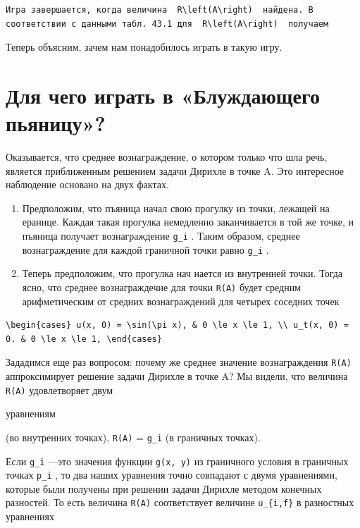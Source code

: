 \documentclass[
  ukrainian,
]{article}
\begin{document}
\begin{verbatim}
Игра завершается, когда величина  R\left(A\right)  найдена. В соответствии с данными табл. 43.1 для  R\left(A\right)  получаем
\end{verbatim}

Теперь объясним, зачем нам понадобилось играть в такую игру.

\section{Для чего играть в «Блуждающего
пьяницу»?}\label{ux434ux43bux44f-ux447ux435ux433ux43e-ux438ux433ux440ux430ux442ux44c-ux432-ux431ux43bux443ux436ux434ux430ux44eux449ux435ux433ux43e-ux43fux44cux44fux43dux438ux446ux443}

Оказывается, что среднее вознаграждение, о котором только что шла речь,
является приближенным решением задачи Дирихле в точке A. Это интересное
наблюдение основано на двух фактах.

\begin{enumerate}
\def\labelenumi{\arabic{enumi}.}
\item
  Предположим, что пъяница начал свою прогулку из точки, лежащей на
  еранице. Каждая такая прогулка немедленно заканчивается в той же
  точке, и пъяница получает вознаграждение \texttt{g\_i} . Таким
  образом, среднее вознаграждение для каждой граничной точки равно
  \texttt{g\_i} .
\item
  Теперь предположим, что прогулка нач нается из внутренней точки. Тогда
  ясно, что среднее вознаграждечие для точки \texttt{R(A)} будет средним
  арифметическим от средних вознаграждений для четырех соседних точек
\end{enumerate}

\begin{verbatim}
\begin{cases} u(x, 0) = \sin(\pi x), & 0 \le x \le 1, \\ u_t(x, 0) = 0. & 0 \le x \le 1, \end{cases}
\end{verbatim}

Зададимся еще раз вопросом: почему же среднее значение вознаграждения
\texttt{R(A)} аппроксимирует решение задачи Дирихле в точке A? Мы
видели, что величина \texttt{R(A)} удовлетворяет двум

уравнениям

(во внутренних точках), \texttt{R(A)} = \texttt{g\_i} (в граничных
точках).

Если \texttt{g\_i} ---это значения функции \texttt{g(x,\ y)} из
граничного условия в граничных точках \texttt{p\_i} , то два наших
уравнения точно совпадают с двумя уравнениями, которые были получены при
решении задачи Дирихле методом конечных разностей. То есть величина
\texttt{R(A)} соответствует величине \texttt{u\_\{i,f\}} в разностных
уравнениях
\end{document}
